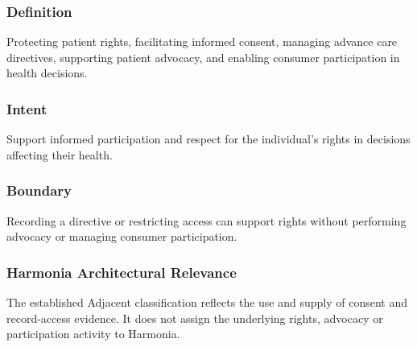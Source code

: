 \subsubsection*{Definition}

Protecting patient rights, facilitating informed consent, managing advance care directives, supporting patient advocacy, and enabling consumer participation in health decisions.

\subsubsection*{Intent}

Support informed participation and respect for the individual's rights in decisions affecting their health.

\subsubsection*{Boundary}

Recording a directive or restricting access can support rights without performing advocacy or managing consumer participation.

\subsubsection*{Harmonia Architectural Relevance}

The established Adjacent classification reflects the use and supply of consent and record-access evidence. It does not assign the underlying rights, advocacy or participation activity to Harmonia.


